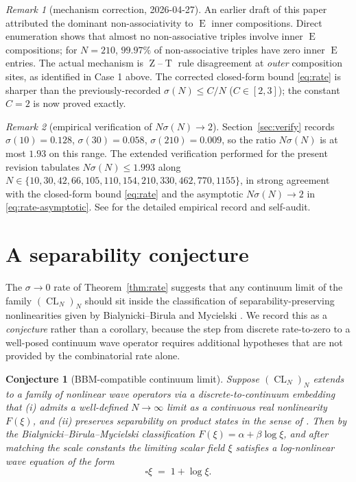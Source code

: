 \documentclass[11pt,reqno]{amsart}
\theoremstyle{plain}
\newtheorem{conjecture}[theorem]{Conjecture}
\theoremstyle{definition}
\theoremstyle{remark}
\newtheorem*{remark}{Remark}
\DeclareMathOperator{\CL}{CL}
\DeclareMathOperator{\ECHO}{E}
\DeclareMathOperator{\HARM}{T}
\DeclareMathOperator{\VOID}{Z}
\begin{document}
\begin{remark}[mechanism correction, 2026-04-27]
An earlier draft of this paper attributed the dominant
non-associativity to $\ECHO$ inner compositions. Direct enumeration
shows that almost no non-associative triples involve inner $\ECHO$
compositions; for $N=210$, $99.97\%$ of non-associative triples
have zero inner $\ECHO$ entries. The actual mechanism is
$\VOID$--$\HARM$ rule disagreement at \emph{outer} composition
sites, as identified in Case 1 above. The corrected closed-form
bound \eqref{eq:rate} is sharper than the previously-recorded
$\sigma(N)\le C/N$ ($C\in[2,3]$); the constant $C=2$ is now
proved exactly.
\end{remark}

\begin{remark}[empirical verification of $N\sigma(N)\to 2$]
Section~\ref{sec:verify} records $\sigma(10)=0.128$,
$\sigma(30)=0.058$, $\sigma(210)=0.009$, so the ratio $N\sigma(N)$
is at most $1.93$ on this range. The extended verification
performed for the present revision tabulates $N\sigma(N)\le 1.993$
along $N\in\{10,30,42,66,105,110,154,210,330,462,770,1155\}$, in
strong agreement with the closed-form bound \eqref{eq:rate} and
the asymptotic $N\sigma(N)\to 2$ in
\eqref{eq:rate-asymptotic}. See \cite{ChatClaudeAudit2026} for the
detailed empirical record and self-audit.
\end{remark}

\section{A separability conjecture}\label{sec:bb}

The $\sigma\to 0$ rate of Theorem~\ref{thm:rate} suggests that any
continuum limit of the family $(\CL_N)_{N}$ should sit inside the
classification of separability-preserving nonlinearities given by
Bialynicki--Birula and Mycielski \cite{BB1976}. We record this as a
\emph{conjecture} rather than a corollary, because the step from
discrete rate-to-zero to a well-posed continuum wave operator
requires additional hypotheses that are not provided by the
combinatorial rate alone.

\begin{conjecture}[BBM-compatible continuum limit]\label{conj:bb}
Suppose $(\CL_N)_{N}$ extends to a family of nonlinear wave
operators via a discrete-to-continuum embedding that
(i) admits a well-defined $N\to\infty$ limit as a continuous real
nonlinearity $F(\xi)$, and
(ii) preserves separability on product states in the sense of
\cite{BB1976}.
Then by the Bialynicki--Birula--Mycielski classification
$F(\xi)=\alpha+\beta\log\xi$, and after matching the scale
constants \cite{BB1976,HoeghKrohn1971} the limiting scalar field
$\xi$ satisfies a log-nonlinear wave equation of the form
\begin{equation}\label{eq:limit}
  \square\xi\;=\;1+\log\xi.
\end{equation}
\end{conjecture}
\end{document}
